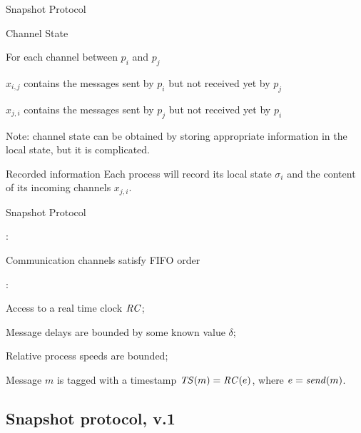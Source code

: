 \begin{frame}{Snapshot Protocol}

\begin{block}{Channel State}
\BIL
\item For each channel between $p_i$ and $p_j$
  \BI
    \item $x_{i,j}$ contains the messages sent by $p_i$ but not received yet by $p_j$ 
    \item $x_{j,i}$ contains the messages sent by $p_j$ but not received yet by $p_i$ 
  \EI
\item Note: channel state can be obtained by storing appropriate information
  in the local state, but it is complicated.
\EIL
\end{block}

\bigskip
\begin{block}{Recorded information}
Each process will record its local state $\sigma_i$ and the content of its
\alert{incoming} channels $x_{j,i}$.
\end{block}

\end{frame}

\begin{frame}{Snapshot Protocol}

:
\BIL
\item Communication channels satisfy FIFO order
\EIL

\bigskip
{}:
\BIL
\item Access to a real time clock $\mathit{RC}$;
\item Message delays are bounded by some known value $\delta$;
\item Relative process speeds are bounded;
\item Message $m$ is tagged with a timestamp $\mathit{TS}(m) = \mathit{RC}(e)$, where $e = \mathit{send}(m)$.
\EIL
\end{frame}

\subsection{Snapshot protocol, v.1}

